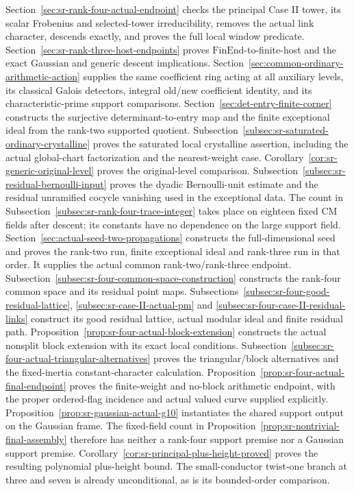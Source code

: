 Section~\ref{sec:sr-rank-four-actual-endpoint} checks the principal
Case II tower, its scalar Frobenius and selected-tower irreducibility,
removes the actual link character, descends exactly, and proves the
full local window predicate.
Section~\ref{sec:sr-rank-three-host-endpoints} proves
\(\mathrm{FinEnd}\)-to-finite-host and the exact Gaussian and generic
descent implications.
Section~\ref{sec:common-ordinary-arithmetic-action} supplies the
same coefficient ring acting at all auxiliary levels, its classical
Galois detectors, integral old/new coefficient identity, and its
characteristic-prime support comparisons.
Section~\ref{sec:det-entry-finite-corner} constructs the surjective
determinant-to-entry map and the finite exceptional ideal from the
rank-two supported quotient.
Subsection~\ref{subsec:sr-saturated-ordinary-crystalline} proves
the saturated local crystalline assertion, including the actual
global-chart factorization and the nearest-weight case.
Corollary~\ref{cor:sr-generic-original-level} proves the
original-level comparison.
Subsection~\ref{subsec:sr-residual-bernoulli-input} proves the
dyadic Bernoulli-unit estimate and the residual unramified
cocycle vanishing used in the exceptional data.
The count in Subsection~\ref{subsec:sr-rank-four-trace-integer}
takes place on eighteen fixed CM fields after descent;
its constants have no dependence on the large support field.
Section~\ref{sec:actual-seed-two-propagations} constructs the
full-dimensional seed and proves the rank-two run, finite
exceptional ideal and rank-three run in that order.
It supplies the actual common rank-two/rank-three endpoint.
Subsection~\ref{subsec:sr-four-common-space-construction}
constructs the rank-four common space and its residual point
maps. Subsections~\ref{subsec:sr-four-good-residual-lattice},
\ref{subsec:sr-case-II-actual-pm} and
\ref{subsec:sr-four-case-II-residual-links} construct its good
residual lattice, actual modular ideal and finite residual path.
Proposition~\ref{prop:sr-four-actual-block-extension} constructs
the actual nonsplit block extension with its exact local conditions.
Subsection~\ref{subsec:sr-four-actual-triangular-alternatives}
proves the triangular/block alternatives and the fixed-inertia
constant-character calculation.
Proposition~\ref{prop:sr-four-actual-final-endpoint} proves the
finite-weight and no-block arithmetic endpoint, with the proper
ordered-flag incidence and actual valued curve supplied explicitly.
Proposition~\ref{prop:sr-gaussian-actual-g10} instantiates the
shared support output on the Gaussian frame.
The fixed-field count in
Proposition~\ref{prop:sr-nontrivial-final-assembly} therefore
has neither a rank-four support premise nor a Gaussian support
premise. Corollary~\ref{cor:sr-principal-plus-height-proved}
proves the resulting polynomial plus-height bound.
The small-conductor twist-one branch at three and seven is already
unconditional, as is its bounded-order comparison.


